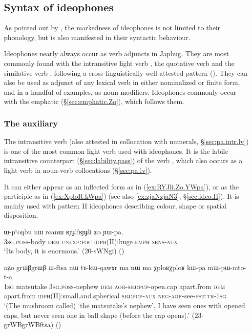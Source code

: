 \subsection{Syntax of ideophones} \label{sec:idph.syntax}
As pointed out by \citet[660]{dingemanse12ideo}, the markedness of ideophones is not limited to their phonology, but is also manifested in their syntactic behaviour.

Ideophones nearly always occur as verb adjuncts in Japhug. They are most commonly found with the intransitive light verb , the quotative verb  and the similative verb , following a cross-linguistically well-attested pattern (\citealt[280--288]{guldemann08quot}). They can also be used as adjunct of any lexical verb in either nominalized or finite form, and in a handful of examples, as noun modifiers. Ideophones commonly occur with the emphatic  (§\ref{sec:emphatic.Zo}), which follows them.

\subsubsection{The auxiliary } \label{sec:idph.pa}
The intransitive verb  (also attested in collocation with numerals, §\ref{sec:pa.intr.lv}) is one of the most common light verb used with ideophones. It is the labile intransitive counterpart (§\ref{sec:lability.pass}) of the verb , which also occurs as a light verb in noun-verb collocations (§\ref{sec:pa.lv}). 

It can either appear as an inflected form as in (\ref{ex:RYJli.Zo.YWpa}), or as the participle  as in (\ref{ex:XploR.kWpa}) (see also \ref{ex:zjaNzjaN3}, §\ref{sec:ideo.II}). It is mainly used with pattern II ideophones describing colour, shape or spatial disposition.

 
\begin{exe}
\ex \label{ex:RYJli.Zo.YWpa}
\gll ɯ-pʰoŋbu nɯ rcanɯ ʁɲɟlíʁɲɟli ʑo ɲɯ-pa. \\
\textsc{3sg}.\textsc{poss}-body \textsc{dem} \textsc{unexp}:\textsc{foc} \textsc{idph}(II):huge \textsc{emph} \textsc{sens}-\textsc{aux} \\
\glt  `Its body, it is enormous.' (20-sWNgi) 	()
\end{exe}

\begin{exe}
\ex \label{ex:XploR.kWpa}
\gll aʑo grɯβgrɯβ ɯ-ftsa nɯ tɤ-kɯ-qawɤr ma nɯ ma χploʁχploʁ kɯ-pa mɯ-pɯ-mto-t-a \\
\textsc{1sg} matsutake \textsc{3sg}.\textsc{poss}-nephew \textsc{dem} \textsc{aor}-\textsc{sbj}:\textsc{pcp}-open.cap apart.from \textsc{dem} apart.from \textsc{idph}(II):small.and.spherical \textsc{sbj}:\textsc{pcp}-\textsc{aux} \textsc{neg}-\textsc{aor}-see-\textsc{pst}:\textsc{tr}-\textsc{1sg} \\
\glt `(The mushroom called) `the matsutake's nephew', I have seen ones with opened caps, but never seen one in ball shape (before the cap opens).' (23-grWBgrWBftsa)
()
\end{exe}

